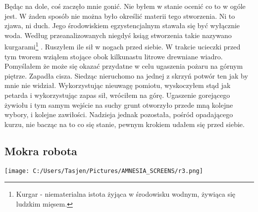 \documentclass[12pt,a4paper]{report}
\begin{document}
Będąc na dole, coś zaczęło mnie gonić. Nie byłem w stanie ocenić co to w ogóle jest. W żaden sposób nie można było określić materii tego stworzenia. Ni to zjawa, ni duch. Jego środowiskiem egzystencjalnym stawała się być wyłącznie woda. Według przeanalizowanych niegdyś ksiąg stworzenia takie nazywano kurgarami\footnote{Kurgar - niematerialna istota żyjąca w środowisku wodnym, żywiąca się ludzkim mięsem.} . Ruszyłem ile sił w nogach przed siebie.  W trakcie ucieczki przed tym tworem wziąłem stojące obok kilkunastu litrowe drewniane wiadro. Pomyślałem że może się okazać przydatne w celu ugaszenia pożaru na górnym piętrze. Zapadła cisza. Siedząc nieruchomo na jednej z skrzyń potwór ten jak by mnie nie widział. Wykorzystując nieuwagę pomiotu, wyskoczyłem stąd jak petarda i wykorzystując zapas sił, wróciłem na górę. Ugaszenie gorejącego żywiołu i tym samym wejście na suchy grunt otworzyło przede mną kolejne wybory, i kolejne zawiłości. Nadzieja jednak pozostała, pośród opadającego kurzu, nie bacząc na to co się stanie, pewnym krokiem udałem się przed siebie.
\subsection{Mokra robota}
\begin{center}
\texttt{[image: C:/Users/Tasjen/Pictures/AMNESIA\_SCREENS/r3.png]} \\
\end{center}
\end{document}
